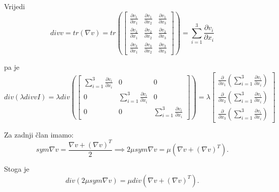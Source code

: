 \documentclass[a4paper,oneside,12pt]{memoir} %
\begin{document}
Vrijedi
\[
divv
=
tr(\nabla v)
= tr(
\begin{bmatrix}
    \frac{\partial v_1}{\partial x_1} &  \frac{\partial v_1}{\partial x_2} &  \frac{\partial v_1}{\partial x_3} \\
    \frac{\partial v_2}{\partial x_1} &  \frac{\partial v_2}{\partial x_2} &  \frac{\partial v_2}{\partial x_3} \\
    \frac{\partial v_3}{\partial x_1} &  \frac{\partial v_3}{\partial x_2} &  \frac{\partial v_3}{\partial x_3}
\end{bmatrix})
=
\sum_{i=1}^{3} \frac{\partial v_i}{\partial x_i}
\]

pa je
\[
div(\lambda divvI)
=
\lambda div(
\begin{bmatrix}
     \sum_{i=1}^{3} \frac{\partial v_i}{\partial x_i} &  0 &  0 \\
     0 &  \sum_{i=1}^{3} \frac{\partial v_i}{\partial x_i} &  0 \\
     0 &  0 &  \sum_{i=1}^{3} \frac{\partial v_i}{\partial x_i}
\end{bmatrix})
=
\lambda \begin{bmatrix}
     \frac{\partial}{\partial x_1} (\sum_{i=1}^{3} \frac{\partial v_i}{\partial x_i}) \\
     \frac{\partial}{\partial x_2} (\sum_{i=1}^{3} \frac{\partial v_i}{\partial x_i}) \\
     \frac{\partial}{\partial x_3} (\sum_{i=1}^{3} \frac{\partial v_i}{\partial x_i})
\end{bmatrix}
\]

Za zadnji član imamo:
\begin{equation*}
sym \nabla v = \frac{\nabla v + (\nabla v)^T}{2} \implies 2 \mu sym \nabla v = \mu (\nabla v + (\nabla v)^T).
\end{equation*}

Stoga je
\begin{equation*}
div(2\mu sym\nabla v) = \mu div(\nabla v + (\nabla v)^T).
\end{equation*}
\end{document}
